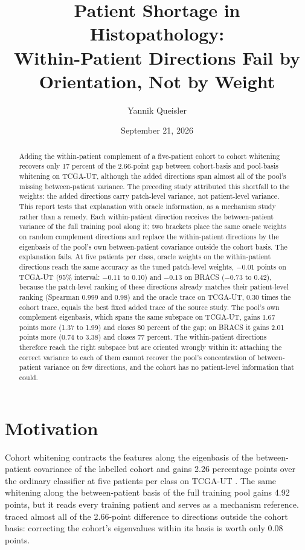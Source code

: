 \documentclass[11pt]{article}
\title{Patient Shortage in Histopathology:\\Within-Patient Directions Fail by Orientation, Not by Weight}
\author{Yannik Queisler}
\date{September 21, 2026}
\begin{document}
\raggedbottom
{}
\setlength{\emergencystretch}{2em}
\maketitle
\begin{abstract}
\noindent Adding the within-patient complement of a five-patient cohort to cohort whitening recovers only 17 percent of the 2.66-point gap between cohort-basis and pool-basis whitening on TCGA-UT, although the added directions span almost all of the pool's missing between-patient variance. The preceding study attributed this shortfall to the weights: the added directions carry patch-level variance, not patient-level variance. This report tests that explanation with oracle information, as a mechanism study rather than a remedy. Each within-patient direction receives the between-patient variance of the full training pool along it; two brackets place the same oracle weights on random complement directions and replace the within-patient directions by the eigenbasis of the pool's own between-patient covariance outside the cohort basis. The explanation fails. At five patients per class, oracle weights on the within-patient directions reach the same accuracy as the tuned patch-level weights, $-0.01$ points on TCGA-UT (95\% interval: $-0.11$ to 0.10) and $-0.13$ on BRACS ($-0.73$ to 0.42), because the patch-level ranking of these directions already matches their patient-level ranking (Spearman 0.999 and 0.98) and the oracle trace on TCGA-UT, 0.30 times the cohort trace, equals the best fixed added trace of the source study. The pool's own complement eigenbasis, which spans the same subspace on TCGA-UT, gains 1.67 points more (1.37 to 1.99) and closes 80 percent of the gap; on BRACS it gains 2.01 points more (0.74 to 3.38) and closes 77 percent. The within-patient directions therefore reach the right subspace but are oriented wrongly within it: attaching the correct variance to each of them cannot recover the pool's concentration of between-patient variance on few directions, and the cohort has no patient-level information that could.
\end{abstract}

\section{Motivation}
\label{sec:motivation}
Cohort whitening contracts the features along the eigenbasis of the between-patient covariance of the labelled cohort and gains 2.26 percentage points over the ordinary classifier at five patients per class on TCGA-UT \citep{queisler2026patientDirections}. The same whitening along the between-patient basis of the full training pool gains 4.92 points, but it reads every training patient and serves as a mechanism reference. \citet{queisler2026spectrumRegularization} traced almost all of the 2.66-point difference to directions outside the cohort basis: correcting the cohort's eigenvalues within its basis is worth only 0.08 points.
\end{document}
